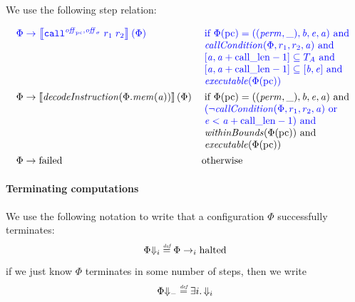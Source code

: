 \documentclass[a4paper]{article}
\begin{document}
We use the following step relation:

\begin{align*}
  \src{\Phi} & \; \src{\step \sem{\scall{\offpc,\offsigma}{r_1}{r_2}}(\Phi)} &  &\sourcecolor\left.\arraycolsep=0pt
                                                  \begin{array}[t]{l}
                                                    \text{if }\Phi(\pcreg) 
= ((\perm,\_),\baddr,\eaddr,\aaddr) \tand \\
                                                    \callCond{\Phi,r_1,r_2,\aaddr} \tand\\
                                                    \lbrack \aaddr ,\aaddr + \calllen - 1\rbrack \subseteq \ta \tand \\
                                                    \lbrack\aaddr,\aaddr + \calllen-1\rbrack \subseteq [\baddr,\eaddr] \tand \\
                                                    \exec{\Phi(\pcreg)}
                                                  \end{array}\right.\\
  \Phi & \step \sem{\decInstr{\Phi.\mem(\aaddr)}}(\Phi) & &\left.\arraycolsep=0pt
                                                  \begin{array}[t]{l}
                                                    \text{if }\Phi(\pcreg) = ((\perm,\_),\baddr,\eaddr,\aaddr) \tand \\
                                                    \src{(\neg\callCond{\Phi,r_1,r_2,\aaddr} \tor}\\
                                                    \src{\eaddr < \aaddr + \calllen-1) \tand} \\
                                                    \withinBounds{\Phi(\pcreg)} \tand \\
                                                    \exec{\Phi(\pcreg)}
                                                  \end{array}\right.\\
  \Phi& \step \failed & & \totherwise
\end{align*}

\paragraph{Terminating computations}
We use the following notation to write that a configuration $\Phi$ successfully terminates:
\[
  \Phi\term[i] \defeq \Phi \nstep[i] \halted
\]
if we just know $\Phi$ terminates in some number of steps, then we write
\[
  \Phi\term \defeq \exists i \ldotp \term[i]
\]
\end{document}
